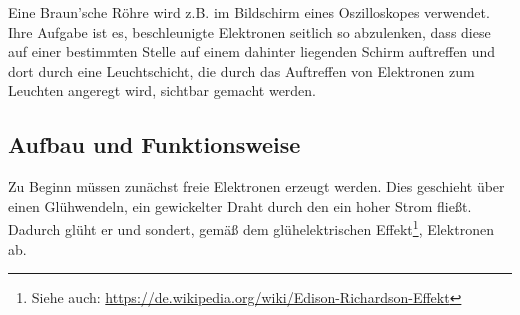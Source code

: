 




%
%	





Eine Braun'sche Röhre wird z.B. im Bildschirm eines Oszilloskopes verwendet. Ihre Aufgabe ist es, beschleunigte Elektronen seitlich so abzulenken, dass diese auf einer bestimmten Stelle auf einem dahinter liegenden Schirm auftreffen und dort durch eine Leuchtschicht, die durch das Auftreffen von Elektronen zum Leuchten angeregt wird, sichtbar gemacht werden.

\subsection{Aufbau und Funktionsweise}

Zu Beginn müssen zunächst freie Elektronen erzeugt werden. Dies geschieht über einen Glühwendeln, ein gewickelter Draht durch den ein hoher Strom fließt. Dadurch glüht er und sondert, gemäß dem glühelektrischen Effekt\footnote{Siehe auch: \url{https://de.wikipedia.org/wiki/Edison-Richardson-Effekt}}, Elektronen ab.

